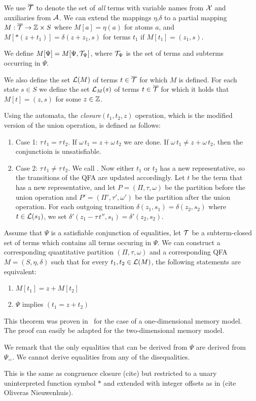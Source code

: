 We use ${\overline{\mathcal{T}}}$ to denote the set of \emph{all} terms with variable names from $\mathcal{X}$ and auxiliaries from $\mathcal{A}$.
We can extend the mappings $\eta$,$\delta$ to a partial mapping $M : {\overline{\mathcal{T}}} \rightarrow \mathbb{Z} \times S$ where $M[a] = \eta(a)$ for atoms $a$, and $M[*(z+t_1)] = \delta(z+z_1, s)$ for terms $t_1$ if $M[t_1] = (z_1,s)$.

We define $M[\Psi] = M[\Psi,\mathcal{T}_\Psi]$, where $\mathcal{T}_\Psi$ is the set of terms and subterms occurring in $\Psi$.

We also define the set $\mathcal{L}(M)$ of terms $t \in {\overline{\mathcal{T}}}$ for which $M$ is defined.
For each state $s \in S$ we define the set $\mathcal{L}_M(s)$ of terms $t \in {\overline{\mathcal{T}}}$ for which it holds that $M[t] = (z, s)$ for some $z \in \mathbb{Z}$.

Using the automata, the \emph{closure}$(t_1,t_2,z)$ operation, which is the modified version of the union operation, is defined as follows:

\begin{enumerate}
  \item Case 1: $\tau\,t_1 = \tau\,t_2$. If $\omega\,t_1 = z + \omega\,t_2$ we are done.
  If $\omega\,t_1 \neq z + \omega\,t_2$, then the conjunctioin is unsatisfiable.
  \item Case 2: $\tau\,t_1 \neq \tau\,t_2$. We call .
  Now either $t_1$ or $t_2$ has a new representative, so the transitions of the QFA are updated accordingly.
  Let $t$ be the term that has a new representative,
  and let $P = (\Pi, \tau, \omega)$ be the partition before the union operation and $P' = (\Pi', \tau', \omega')$ be the partition after the union operation.
  For each outgoing transition $\delta(z_1, s_1) = \delta(z_2, s_2)$ where $t \in \mathcal{L}(s_1)$,
  we set $\delta'(z_1 - \tau\,t'', s_1) = \delta'(z_2, s_2)$.
\end{enumerate}

\begin{theorem}
  Assume that $\Psi$ is a satisfiable conjunction of equalities, let $\mathcal{T}$ be a subterm-closed set of terms which contains all terms occuring in $\Psi$. We can construct a corresponding quantitative partition $(\Pi, \tau,\omega)$
  and a corresponding QFA $M = (S, \eta, \delta)$ such that for every $t_1, t_2 \in \mathcal{L}(M)$, the following statements are equivalent:
  \begin{enumerate}
    \item $M[t_1] = z + M[t_2]$
    \item $\Psi$ implies $(t_1 = z + t_2)$
  \end{enumerate}
\end{theorem}

This theorem was proven in~\cite{2pointer} for the case of a one-dimensional memory model.
The proof can easily be adapted for the two-dimensional memory model.

We remark that the only equalities that can be derived from $\Psi$ are derived from $\Psi_=$. We cannot derive equalities from any of the disequalities.

This is the same as congruence closure (cite) but restricted to a unary uninterpreted function symbol $*$ and extended with integer offsets as in (cite Oliveras Nieuwenhuis).

